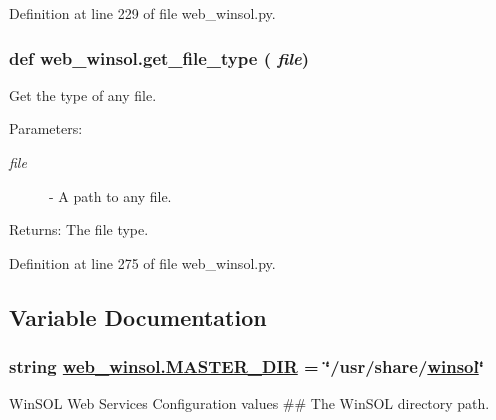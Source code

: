 Definition at line 229 of file web\_\-winsol.py.\hypertarget{namespaceweb__winsol_5ace888d1ca8424d97ab5ae07e44dab3}{
\subsubsection[get\_\-file\_\-type]{\setlength{\rightskip}{0pt plus 5cm}def web\_\-winsol.get\_\-file\_\-type ( {\em file})}}
\label{namespaceweb__winsol_5ace888d1ca8424d97ab5ae07e44dab3}


Get the type of any file. 

\begin{Desc}
\item[Parameters:]
\begin{description}
\item[{\em file}]- A path to any file. \end{description}
\end{Desc}
\begin{Desc}
\item[Returns:]The file type. \end{Desc}


Definition at line 275 of file web\_\-winsol.py.

\subsection{Variable Documentation}
\hypertarget{namespaceweb__winsol_575870dfef202cb94a079c4eb1280e6d}{
\subsubsection[MASTER\_\-DIR]{\setlength{\rightskip}{0pt plus 5cm}string \hyperlink{namespaceweb__winsol_575870dfef202cb94a079c4eb1280e6d}{web\_\-winsol.MASTER\_\-DIR} = \char`\"{}/usr/share/\hyperlink{namespacewinsol_624e4bca2810b741068d3494a5a7612d}{winsol}\char`\"{}}}
\label{namespaceweb__winsol_575870dfef202cb94a079c4eb1280e6d}


Win\-SOL Web Services Configuration values \#\# The Win\-SOL directory path. 



